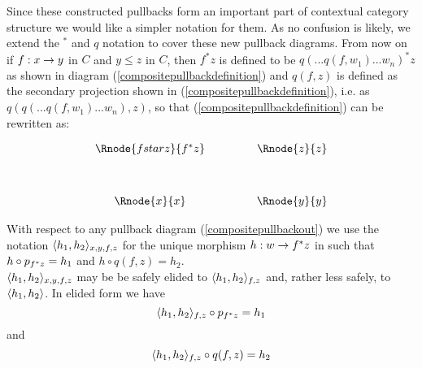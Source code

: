Since these constructed pullbacks form an important part of contextual
category structure we would like a simpler notation for them. As no confusion is
likely, we extend the $^*$ and $q$ notation to cover these new pullback diagrams.
From now on if $f:x \rightarrow y$ in $C$ and $y \leq z$ in $C$, then $f^*z$ 
is defined to be $q(...q(f, w_1)...w_n)^* z$ as shown in diagram (\ref{compositepullbackdefinition}) 
and $q(f,z)$ is defined as the secondary projection shown in (\ref{compositepullbackdefinition}), i.e. as 
$q(q(...q(f,w_1)...w_n),z)$,
so that (\ref{compositepullbackdefinition}) can be rewritten as:

\vspace{3mm}
\begin{center}
\begin{equation}
\label{compositepullbackout}
\begin{array}{cp{.9cm}c}
\Rnode{fstarz}{f^*z} & & \Rnode{z}{z}\\ [1.2cm]
\Rnode{x}{x}         & & \Rnode{y}{y}
\end{array}
\end{equation}
\end{center}
\note
With respect to any pullback diagram (\ref{compositepullbackout})
 we use the notation $\langle h_1,h_2\rangle_{x,y,f,z}$  for the unique morphism   
$h:w \rightarrow f ^* z$ in  such that
$h \circ p_{f ^* z} = h_1$ and $h \circ q(f,z) = h_2$.\\
$\langle h_1,h_2\rangle_{x,y,f,z}$ may be be safely elided to $\langle h_1,h_2\rangle_{f,z}$ and, rather less safely, to $\langle h_1,h_2\rangle$.
In  elided form we  have 
\begin{equation}
\mbox{$\langle h_1,h_2\rangle_{f,z} \circ p_{f^*z} = h_1$}
\end{equation}
and
\begin{equation}
\mbox{$\langle h_1,h_2\rangle_{f,z} \circ q(f,z) = h_2$}
\end{equation}

